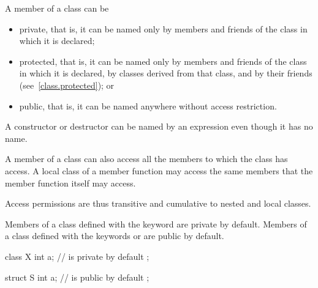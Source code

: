 \pnum
A member of a class can be
\begin{itemize}
\item
{}%
private,
that is, it can be named only by members and friends
of the class in which it is declared;
\item
{}%
protected,
that is, it can be named only by members and friends
of the class in which it is declared, by classes derived from that class, and by their
friends (see~\ref{class.protected}); or
\item
{}%
public,
that is, it can be named anywhere without access restriction.
\end{itemize}
\begin{note}
A constructor or destructor can be named by an expression
even though it has no name.
\end{note}

\pnum
A member of a class can also access all the members to which the class has access.
A local class of a member function may access
the same members that the member function itself may access.
\begin{footnote}
Access
permissions are thus transitive and cumulative to nested
and local classes.
\end{footnote}

\pnum
{}%
%
%
Members of a class defined with the keyword
are private by default.
Members of a class defined with the keywords
 or 
are public by default.
\begin{example}
\begin{codeblock}
class X {
  int a;            //  is private by default
};

struct S {
  int a;            //  is public by default
};
\end{codeblock}
\end{example}

